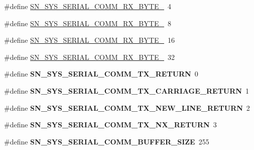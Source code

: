 \begin{DoxyCompactItemize}
\item 
\#define \hyperlink{group__SYSTEM__SERIAL__COMM_ga20e8092429292afa4348544ee9fafec3}{S\+N\+\_\+\+S\+Y\+S\+\_\+\+S\+E\+R\+I\+A\+L\+\_\+\+C\+O\+M\+M\+\_\+\+R\+X\+\_\+\+B\+Y\+T\+E\+\_}~4
\item 
\#define \hyperlink{group__SYSTEM__SERIAL__COMM_gaeeb374cea7f99086bd693aa158af8dc8}{S\+N\+\_\+\+S\+Y\+S\+\_\+\+S\+E\+R\+I\+A\+L\+\_\+\+C\+O\+M\+M\+\_\+\+R\+X\+\_\+\+B\+Y\+T\+E\+\_}~8
\item 
\#define \hyperlink{group__SYSTEM__SERIAL__COMM_ga56161a71858040bee49e45caeb42787a}{S\+N\+\_\+\+S\+Y\+S\+\_\+\+S\+E\+R\+I\+A\+L\+\_\+\+C\+O\+M\+M\+\_\+\+R\+X\+\_\+\+B\+Y\+T\+E\+\_}~16
\item 
\#define \hyperlink{group__SYSTEM__SERIAL__COMM_ga532ba920d82c8b8bf35997df3c732d4c}{S\+N\+\_\+\+S\+Y\+S\+\_\+\+S\+E\+R\+I\+A\+L\+\_\+\+C\+O\+M\+M\+\_\+\+R\+X\+\_\+\+B\+Y\+T\+E\+\_}~32
\item 
\mbox{\label{group__SYSTEM__SERIAL__COMM_ga51f152fbdb061eaddc04d5840b5f23dd}} 
\#define {\bfseries S\+N\+\_\+\+S\+Y\+S\+\_\+\+S\+E\+R\+I\+A\+L\+\_\+\+C\+O\+M\+M\+\_\+\+T\+X\+\_\+\+R\+E\+T\+U\+RN}~0
\item 
\mbox{\label{group__SYSTEM__SERIAL__COMM_ga81ba02d50e3bf740e33accc792ec0bf8}} 
\#define {\bfseries S\+N\+\_\+\+S\+Y\+S\+\_\+\+S\+E\+R\+I\+A\+L\+\_\+\+C\+O\+M\+M\+\_\+\+T\+X\+\_\+\+C\+A\+R\+R\+I\+A\+G\+E\+\_\+\+R\+E\+T\+U\+RN}~1
\item 
\mbox{\label{group__SYSTEM__SERIAL__COMM_ga96c2a829d5aa963c53ee3f5607ef22fa}} 
\#define {\bfseries S\+N\+\_\+\+S\+Y\+S\+\_\+\+S\+E\+R\+I\+A\+L\+\_\+\+C\+O\+M\+M\+\_\+\+T\+X\+\_\+\+N\+E\+W\+\_\+\+L\+I\+N\+E\+\_\+\+R\+E\+T\+U\+RN}~2
\item 
\mbox{\label{group__SYSTEM__SERIAL__COMM_gafd10cc942a02102c07732e46041819bf}} 
\#define {\bfseries S\+N\+\_\+\+S\+Y\+S\+\_\+\+S\+E\+R\+I\+A\+L\+\_\+\+C\+O\+M\+M\+\_\+\+T\+X\+\_\+\+N\+X\+\_\+\+R\+E\+T\+U\+RN}~3
\item 
\mbox{\label{group__SYSTEM__SERIAL__COMM_ga741f5eba82633e103f491a30e0f9696a}} 
\#define {\bfseries S\+N\+\_\+\+S\+Y\+S\+\_\+\+S\+E\+R\+I\+A\+L\+\_\+\+C\+O\+M\+M\+\_\+\+B\+U\+F\+F\+E\+R\+\_\+\+S\+I\+ZE}~255

\end{DoxyCompactItemize}
